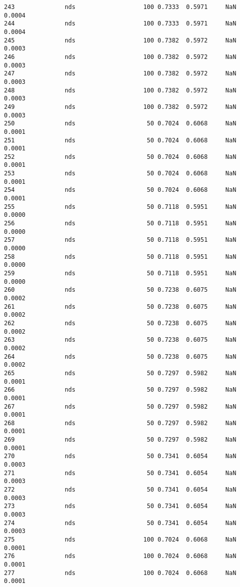 \documentclass[11pt]{article}
\begin{document}
\begin{Verbatim}[commandchars=\\\{\}]
243              nds                   100 0.7333  0.5971     NaN 0.0004   
244              nds                   100 0.7333  0.5971     NaN 0.0004   
245              nds                   100 0.7382  0.5972     NaN 0.0003   
246              nds                   100 0.7382  0.5972     NaN 0.0003   
247              nds                   100 0.7382  0.5972     NaN 0.0003   
248              nds                   100 0.7382  0.5972     NaN 0.0003   
249              nds                   100 0.7382  0.5972     NaN 0.0003   
250              nds                    50 0.7024  0.6068     NaN 0.0001   
251              nds                    50 0.7024  0.6068     NaN 0.0001   
252              nds                    50 0.7024  0.6068     NaN 0.0001   
253              nds                    50 0.7024  0.6068     NaN 0.0001   
254              nds                    50 0.7024  0.6068     NaN 0.0001   
255              nds                    50 0.7118  0.5951     NaN 0.0000   
256              nds                    50 0.7118  0.5951     NaN 0.0000   
257              nds                    50 0.7118  0.5951     NaN 0.0000   
258              nds                    50 0.7118  0.5951     NaN 0.0000   
259              nds                    50 0.7118  0.5951     NaN 0.0000   
260              nds                    50 0.7238  0.6075     NaN 0.0002   
261              nds                    50 0.7238  0.6075     NaN 0.0002   
262              nds                    50 0.7238  0.6075     NaN 0.0002   
263              nds                    50 0.7238  0.6075     NaN 0.0002   
264              nds                    50 0.7238  0.6075     NaN 0.0002   
265              nds                    50 0.7297  0.5982     NaN 0.0001   
266              nds                    50 0.7297  0.5982     NaN 0.0001   
267              nds                    50 0.7297  0.5982     NaN 0.0001   
268              nds                    50 0.7297  0.5982     NaN 0.0001   
269              nds                    50 0.7297  0.5982     NaN 0.0001   
270              nds                    50 0.7341  0.6054     NaN 0.0003   
271              nds                    50 0.7341  0.6054     NaN 0.0003   
272              nds                    50 0.7341  0.6054     NaN 0.0003   
273              nds                    50 0.7341  0.6054     NaN 0.0003   
274              nds                    50 0.7341  0.6054     NaN 0.0003   
275              nds                   100 0.7024  0.6068     NaN 0.0001   
276              nds                   100 0.7024  0.6068     NaN 0.0001   
277              nds                   100 0.7024  0.6068     NaN 0.0001   

\end{Verbatim}
\end{document}
